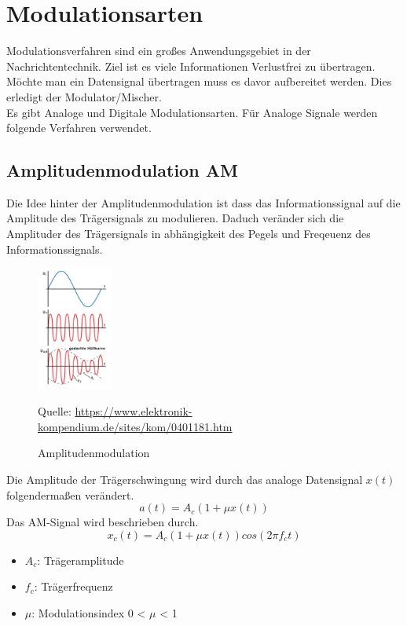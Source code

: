 \section{Modulationsarten}
Modulationsverfahren sind ein großes Anwendungsgebiet in der Nachrichtentechnik.
Ziel ist es viele Informationen Verlustfrei zu übertragen.
Möchte man ein Datensignal übertragen muss es davor
aufbereitet werden. Dies erledigt der Modulator/Mischer.
\\
Es gibt Analoge und Digitale Modulationsarten.
Für Analoge Signale werden folgende Verfahren verwendet.


\subsection{Amplitudenmodulation AM}
Die Idee hinter der Amplitudenmodulation ist dass das Informationssignal
auf die Amplitude des Trägersignals zu modulieren.
Daduch veränder sich die Amplituder des Trägersignals in abhängigkeit des Pegels und 
Freqeuenz des Informationssignals.
\\
\begin{figure}[h]
    \centering
    \includegraphics[width=0.22\textwidth]{Pictures/Screenshot 2025-06-19 125508.png}
    \caption{Amplitudenmodulation}
    \footnotesize{Quelle: \url{https://www.elektronik-kompendium.de/sites/kom/0401181.htm}}
    \label{fig:link_budget}
\end{figure}
\clearpage
Die Amplitude der Trägerschwingung wird durch das analoge Datensignal
$x(t)$ folgendermaßen verändert.
\begin{equation}
    a(t)=A_c(1+\mu x(t))
\end{equation}
Das AM-Signal wird beschrieben durch.
\begin{equation}
    x_c(t)=A_c(1+\mu x(t))cos(2\pi f_c t)
\end{equation}
\begin{itemize}
    \item $A_c$: Trägeramplitude
    \item $f_c$: Trägerfrequenz
    \item $\mu$: Modulationsindex 0 < $\mu$ < 1
\end{itemize}


